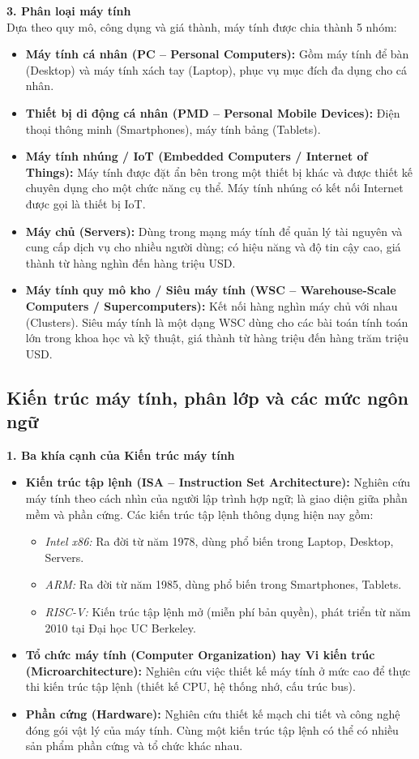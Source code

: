 \textbf{3. Phân loại máy tính}\\
Dựa theo quy mô, công dụng và giá thành, máy tính được chia thành 5 nhóm:
\begin{itemize}
    \item \textbf{Máy tính cá nhân (PC -- Personal Computers):} Gồm máy tính để bàn (Desktop) và máy tính xách tay (Laptop), phục vụ mục đích đa dụng cho cá nhân.
    \item \textbf{Thiết bị di động cá nhân (PMD -- Personal Mobile Devices):} Điện thoại thông minh (Smartphones), máy tính bảng (Tablets).
    \item \textbf{Máy tính nhúng / IoT (Embedded Computers / Internet of Things):} Máy tính được đặt ẩn bên trong một thiết bị khác và được thiết kế chuyên dụng cho một chức năng cụ thể. Máy tính nhúng có kết nối Internet được gọi là thiết bị IoT.
    \item \textbf{Máy chủ (Servers):} Dùng trong mạng máy tính để quản lý tài nguyên và cung cấp dịch vụ cho nhiều người dùng; có hiệu năng và độ tin cậy cao, giá thành từ hàng nghìn đến hàng triệu USD.
    \item \textbf{Máy tính quy mô kho / Siêu máy tính (WSC -- Warehouse-Scale Computers / Supercomputers):} Kết nối hàng nghìn máy chủ với nhau (Clusters). Siêu máy tính là một dạng WSC dùng cho các bài toán tính toán lớn trong khoa học và kỹ thuật, giá thành từ hàng triệu đến hàng trăm triệu USD.
\end{itemize}

\subsection{Kiến trúc máy tính, phân lớp và các mức ngôn ngữ}

\textbf{1. Ba khía cạnh của Kiến trúc máy tính}
\begin{itemize}
    \item \textbf{Kiến trúc tập lệnh (ISA -- Instruction Set Architecture):} Nghiên cứu máy tính theo cách nhìn của người lập trình hợp ngữ; là giao diện giữa phần mềm và phần cứng. Các kiến trúc tập lệnh thông dụng hiện nay gồm:
    \begin{itemize}
        \item \textit{Intel x86:} Ra đời từ năm 1978, dùng phổ biến trong Laptop, Desktop, Servers.
        \item \textit{ARM:} Ra đời từ năm 1985, dùng phổ biến trong Smartphones, Tablets.
        \item \textit{RISC-V:} Kiến trúc tập lệnh mở (miễn phí bản quyền), phát triển từ năm 2010 tại Đại học UC Berkeley.
    \end{itemize}
    \item \textbf{Tổ chức máy tính (Computer Organization) hay Vi kiến trúc (Microarchitecture):} Nghiên cứu việc thiết kế máy tính ở mức cao để thực thi kiến trúc tập lệnh (thiết kế CPU, hệ thống nhớ, cấu trúc bus).
    \item \textbf{Phần cứng (Hardware):} Nghiên cứu thiết kế mạch chi tiết và công nghệ đóng gói vật lý của máy tính. Cùng một kiến trúc tập lệnh có thể có nhiều sản phẩm phần cứng và tổ chức khác nhau.
\end{itemize}

